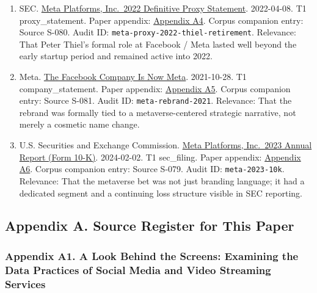 \documentclass[
  american,
  11pt,
  letterpaper,
]{article}
\begin{document}
\begin{enumerate}
  the role dated back to 2005.
\item
  SEC.
  \href{https://www.sec.gov/Archives/edgar/data/1326801/000132680122000043/meta2022definitiveproxysta.htm}{Meta
  Platforms, Inc.~2022 Definitive Proxy Statement}. 2022-04-08. T1
  proxy\_statement. Paper appendix:
  \hyperref[ch-01-appendix-a4-meta-platforms-inc-2022-definitive-proxy-statement]{Appendix
  A4}. Corpus companion entry: Source S-080. Audit ID:
  \texttt{meta-proxy-2022-thiel-retirement}. Relevance: That Peter
  Thiel's formal role at Facebook / Meta lasted well beyond the early
  startup period and remained active into 2022.
\item
  Meta.
  \href{https://about.fb.com/news/2021/10/facebook-company-is-now-meta/}{The
  Facebook Company Is Now Meta}. 2021-10-28. T1 company\_statement.
  Paper appendix:
  \hyperref[ch-01-appendix-a5-the-facebook-company-is-now-meta]{Appendix
  A5}. Corpus companion entry: Source S-081. Audit ID:
  \texttt{meta-rebrand-2021}. Relevance: That the rebrand was formally
  tied to a metaverse-centered strategic narrative, not merely a
  cosmetic name change.
\item
  U.S. Securities and Exchange Commission.
  \href{https://www.sec.gov/Archives/edgar/data/1326801/000132680124000012/meta-20231231.htm}{Meta
  Platforms, Inc.~2023 Annual Report (Form 10-K)}. 2024-02-02. T1
  sec\_filing. Paper appendix:
  \hyperref[ch-01-appendix-a6-meta-platforms-inc-2023-annual-report-form-10-k]{Appendix
  A6}. Corpus companion entry: Source S-079. Audit ID:
  \texttt{meta-2023-10k}. Relevance: That the metaverse bet was not just
  branding language; it had a dedicated segment and a continuing loss
  structure visible in SEC reporting.
\end{enumerate}

\subsection{Appendix A. Source Register for This
Paper}\label{appendix-a.-source-register-for-this-paper-1}

\subsubsection{Appendix A1. A Look Behind the Screens: Examining the
Data Practices of Social Media and Video Streaming
Services}\label{ch-01-appendix-a1-a-look-behind-the-screens-examining-the-data-practices-of-social-media-and-video-streaming-services}
\end{document}

